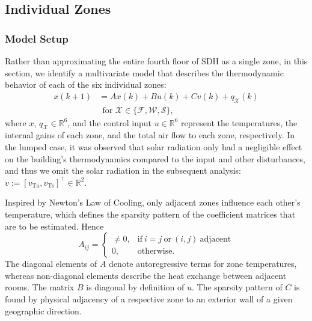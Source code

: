 \subsection{Individual Zones}\label{sec:Indiv_Zones}
\subsubsection{Model Setup}
Rather than approximating the entire fourth floor of SDH as a single zone, in this section, we identify a multivariate model that describes the thermodynamic behavior of each of the six individual zones:
\begin{equation}
\begin{aligned}\label{eq:temp_propagation_indiv}
x(k+1) &= A x(k) + B u(k) + C v(k) + q_{\mathcal{X}}(k) \\
& ~~ \text{for } \mathcal{X} \in \lbrace \mathcal{F}, \mathcal{W}, \mathcal{S} \rbrace,
\end{aligned}
\end{equation}
where $x$, $q_{\mathcal{X}} \in \mathbb{R}^6$, and the control input $u \in \mathbb{R}^6$ represent the temperatures, the internal gains of each zone, and the total air flow to each zone, respectively. In the lumped case, it was observed that solar radiation only had a negligible effect on the building's thermodynamics compared to the input and other disturbances, and thus we omit the solar radiation in the subsequent analysis: $v := \left[ v_\text{Ta}, v_\text{Ts} \right]^\top \in \mathbb{R}^2$.

Inspired by Newton's Law of Cooling, only adjacent zones influence each other's temperature, which defines the sparsity pattern of the coefficient matrices that are to be estimated. Hence 
\begin{equation}
A_{ij} = \begin{cases}
      \neq 0, & \text{if}\ i=j~\text{or}~(i,j)~ \text{adjacent}  \\
      0, & \text{otherwise.}
    \end{cases}
\end{equation}
The diagonal elements of $A$ denote autoregressive terms for zone temperatures, whereas non-diagonal elements describe the heat exchange between adjacent rooms. The matrix $B$ is diagonal by definition of $u$. The sparsity pattern of $C$ is found by physical adjacency of a respective zone to an exterior wall of a given geographic direction.

